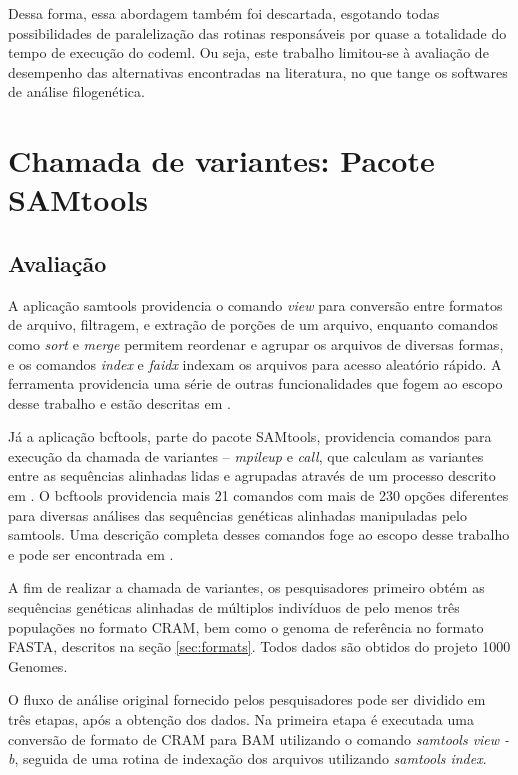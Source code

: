 \documentclass[cic,tc]{iiufrgs}
\begin{document}
{Dessa forma, essa abordagem também foi descartada, esgotando todas
possibilidades de paralelização das rotinas responsáveis por quase a totalidade
do tempo de execução do codeml. Ou seja, este trabalho limitou-se à avaliação
de desempenho das alternativas encontradas na literatura, no que tange os
softwares de análise filogenética.

\section{Chamada de variantes: Pacote SAMtools}
\label{sec:SAMtools}

\subsection{Avaliação}

A aplicação samtools providencia o comando \textit{view} para conversão entre
formatos de arquivo, filtragem, e extração de porções de um arquivo, enquanto
comandos como \textit{sort} e \textit{merge} permitem reordenar e agrupar os
arquivos de diversas formas, e os comandos \textit{index} e \textit{faidx}
indexam os arquivos para acesso aleatório rápido. A ferramenta providencia uma
série de outras funcionalidades que fogem ao escopo desse trabalho e estão
descritas em \cite{danecek2021twelve}.

Já a aplicação bcftools, parte do pacote SAMtools, providencia comandos para
execução da chamada de variantes -- \textit{mpileup} e \textit{call}, que
calculam as variantes entre as sequências alinhadas lidas e agrupadas através
de um processo descrito em \cite{li2011improving}. O bcftools providencia mais
21 comandos com mais de 230 opções diferentes para diversas análises das
sequências genéticas alinhadas manipuladas pelo samtools. Uma descrição
completa desses comandos foge ao escopo desse trabalho e pode ser encontrada em
\cite{danecek2021twelve}.

A fim de realizar a chamada de variantes, os pesquisadores primeiro obtém as
sequências genéticas alinhadas de múltiplos indivíduos de pelo menos três
populações no formato CRAM, bem como o genoma de referência no formato FASTA,
descritos na seção \ref{sec:formats}. Todos dados são obtidos do projeto 1000
Genomes.

O fluxo de análise original fornecido pelos pesquisadores pode ser dividido em
três etapas, após a obtenção dos dados. Na primeira etapa é executada uma
conversão de formato de CRAM para BAM utilizando o comando \textit{samtools
view -b}, seguida de uma rotina de indexação dos arquivos utilizando
\textit{samtools index}.

}
\end{document}
